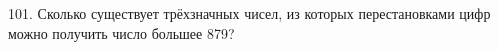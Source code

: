 101. Сколько существует трёхзначных чисел, из которых перестановками цифр можно получить число большее 879?\\
